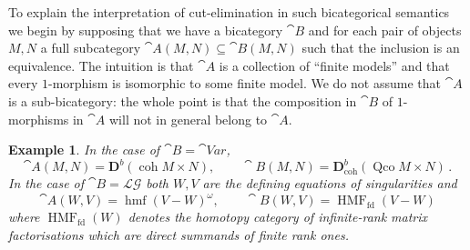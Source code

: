 \documentclass[english,letter paper,12pt,reqno]{article}
\theoremstyle{example}
\newtheorem{example}[theorem]{Example}
\numberwithin{equation}{section}
\def\LG{\mathcal{LG}}
\DeclareMathOperator{\hmf}{hmf}
\DeclareMathOperator{\HMF}{HMF}
\begin{document}
To explain the interpretation of cut-elimination in such bicategorical semantics we begin by supposing that we have a bicategory $\cat{B}$ and for each pair of objects $M,N$ a full subcategory $\cat{A}(M,N) \subseteq \cat{B}(M,N)$ such that the inclusion is an equivalence. The intuition is that $\cat{A}$ is a collection of ``finite models'' and that every $1$-morphism is isomorphic to some finite model. We do not assume that $\cat{A}$ is a sub-bicategory: the whole point is that the composition in $\cat{B}$ of $1$-morphisms in $\cat{A}$ will not in general belong to $\cat{A}$.

\begin{example} In the case of $\cat{B} = \cat{V}ar$,
\begin{equation}\label{eq:example_bicat}
\cat{A}(M,N) = \mathbf{D}^b(\operatorname{coh} M \times N), \qquad \cat{B}(M,N) = \mathbf{D}^b_{\operatorname{coh}}(\operatorname{Qco} M \times N)\,.
\end{equation}
In the case of $\cat{B} = \LG$ both $W,V$ are the defining equations of singularities and
\begin{equation}\label{eq:example_bicat_hmf}
\cat{A}(W,V) = \hmf( V - W )^\omega, \qquad \cat{B}(W,V) = \HMF_{\operatorname{fd}}( V - W )
\end{equation}
where $\HMF_{\operatorname{fd}}(W)$ denotes the homotopy category of infinite-rank matrix factorisations which are direct summands of finite rank ones. 
\end{example}
\end{document}
